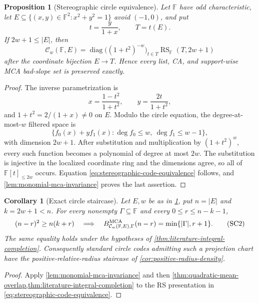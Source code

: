 \documentclass[11pt,a4paper]{amsart}
\numberwithin{equation}{section}
\newtheorem{proposition}[proposition]{Proposition}
\newtheorem{corollary}[corollary]{Corollary}
\theoremstyle{remark}
\DeclareMathOperator{\RS}{RS}
\DeclareMathOperator{\diag}{diag}
\newcommand{\F}{\mathbb F}
\newcommand{\Ccal}{\mathcal C}
\newcommand{\abs}[1]{\lvert #1\rvert}
\begin{document}
\begin{proposition}[Stereographic circle equivalence]
\label{prop:stereographic-circle-equivalence}
Let \(\F\) have odd characteristic, let
\(E\subseteq\{(x,y)\in\F^2:x^2+y^2=1\}\) avoid \((-1,0)\), and put
\[
 t=\frac{y}{1+x},\qquad T=t(E).
\]
If \(2w+1\le\abs E\), then
\[
 \Ccal_w(\F,E)
  =\diag\bigl((1+t^2)^{-w}\bigr)_{t\in T}
       \RS_\F(T,2w+1)                             \tag{SC1}
 \label{eq:stereographic-code-equivalence}
\]
after the coordinate bijection \(E\to T\).  Hence every list, CA, and
support-wise MCA bad-slope set is preserved exactly.
\end{proposition}

\begin{proof}
The inverse parametrization is
\[
 x=\frac{1-t^2}{1+t^2},\qquad
 y=\frac{2t}{1+t^2},
\]
and \(1+t^2=2/(1+x)\ne0\) on \(E\).  Modulo the circle equation, the
degree-at-most-\(w\) filtered space is
\[
 \{f_0(x)+yf_1(x):\deg f_0\le w,\ \deg f_1\le w-1\},
\]
with dimension \(2w+1\).  After substitution and multiplication by
\((1+t^2)^w\), every such function becomes a polynomial of degree at
most \(2w\).  The substitution is injective in the localized coordinate
ring and the dimensions agree, so all of \(\F[t]_{\le2w}\) occurs.
Equation \eqref{eq:stereographic-code-equivalence} follows, and
\cref{lem:monomial-mca-invariance} proves the last assertion.
\end{proof}

\begin{corollary}[Exact circle staircase]
\label{cor:exact-circle-staircase}
Let \(E,w\) be as in \cref{prop:stereographic-circle-equivalence}, put
\(n=\abs E\) and \(k=2w+1<n\).  For every nonempty
\(\Gamma\subseteq\F\) and every \(0\le r\le n-k-1\),
\[
 (n-r)^2\ge n(k+r)
 \quad\Longrightarrow\quad
 B_{\Ccal_w(\F,E),\Gamma}^{\rm MCA}(n-r)
      =\min\{\abs\Gamma,r+1\}.                  \tag{SC2}
\]
The same equality holds under the hypotheses of
\cref{thm:literature-integral-completion}.  Consequently standard circle
codes admitting such a projection chart have the positive-relative-radius staircase of
\cref{cor:positive-radius-density}.
\end{corollary}

\begin{proof}
Apply \cref{lem:monomial-mca-invariance} and then
\cref{thm:quadratic-mean-overlap,thm:literature-integral-completion} to
the RS presentation in
\eqref{eq:stereographic-code-equivalence}.
\end{proof}
\end{document}
